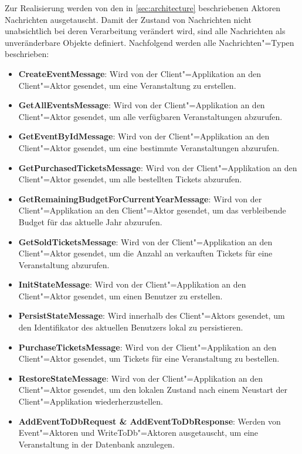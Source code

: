 Zur Realisierung werden von den in \autoref{sec:architecture} beschriebenen Aktoren Nachrichten ausgetauscht.
Damit der Zustand von Nachrichten nicht unabsichtlich bei deren Verarbeitung verändert wird, sind alle Nachrichten als unveränderbare Objekte definiert.
Nachfolgend werden alle Nachrichten"=Typen beschrieben:

\begin{itemize}[itemsep=-.5em,leftmargin=*]
    \item \textbf{CreateEventMessage}: Wird von der Client"=Applikation an den Client"=Aktor gesendet, um eine Veranstaltung zu erstellen.
    \item \textbf{GetAllEventsMessage}: Wird von der Client"=Applikation an den Client"=Aktor gesendet, um alle verfügbaren Veranstaltungen abzurufen.
    \item \textbf{GetEventByIdMessage}: Wird von der Client"=Applikation an den Client"=Aktor gesendet, um eine bestimmte Veranstaltungen abzurufen.
    \item \textbf{GetPurchasedTicketsMessage}: Wird von der Client"=Applikation an den Client"=Aktor gesendet, um alle bestellten Tickets abzurufen.
    \item \textbf{GetRemainingBudgetForCurrentYearMessage}: Wird von der Client"=Applikation an den Client"=Aktor gesendet, um das verbleibende Budget für das aktuelle Jahr abzurufen.
    \item \textbf{GetSoldTicketsMessage}: Wird von der Client"=Applikation an den Client"=Aktor gesendet, um die Anzahl an verkauften Tickets für eine Veranstaltung abzurufen.
    \item \textbf{InitStateMessage}: Wird von der Client"=Applikation an den Client"=Aktor gesendet, um einen Benutzer zu erstellen.
    \item \textbf{PersistStateMessage}: Wird innerhalb des Client"=Aktors gesendet, um den Identifikator des aktuellen Benutzers lokal zu persistieren.
    \item \textbf{PurchaseTicketsMessage}: Wird von der Client"=Applikation an den Client"=Aktor gesendet, um Tickets für eine Veranstaltung zu bestellen.
    \item \textbf{RestoreStateMessage}: Wird von der Client"=Applikation an den Client"=Aktor gesendet, um den lokalen Zustand nach einem Neustart der Client"=Applikation wiederherzustellen.
    \item \textbf{AddEventToDbRequest \& AddEventToDbResponse}: Werden von Event"=Aktoren und WriteToDb"=Aktoren ausgetauscht, um eine Veranstaltung in der Datenbank anzulegen.

\end{itemize}
